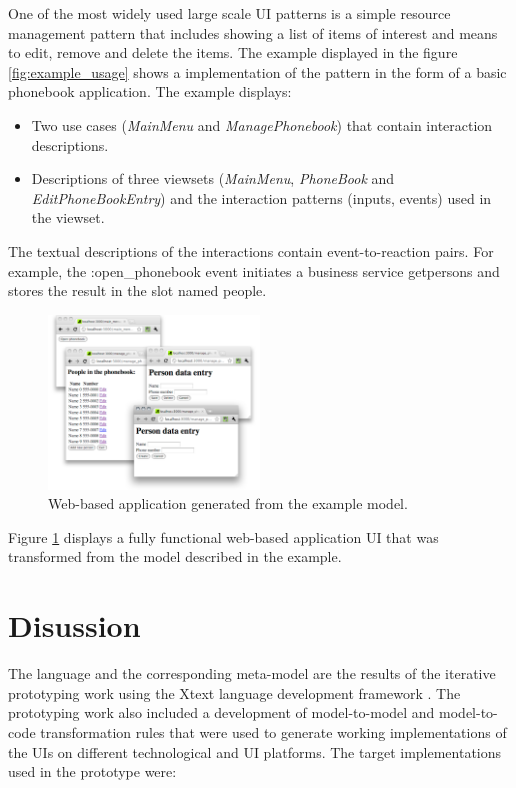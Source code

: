 \documentclass[conference]{IEEEtran}
\begin{document}
One of the most widely used large scale UI patterns is a simple resource
management pattern that includes showing a list of items of interest and means
to edit, remove and delete the items. The example displayed in the figure
\ref{fig:example_usage} shows a implementation of the pattern in the form of a
basic phonebook application. The example displays:

\begin{itemize}
  \item Two use cases (\textit{MainMenu} and \textit{ManagePhonebook}) that
    contain interaction descriptions.
  \item Descriptions of three viewsets (\textit{MainMenu}, \textit{PhoneBook}
    and \textit{EditPhoneBookEntry}) and the interaction patterns (inputs,
    events) used in the viewset.
\end{itemize}

The textual descriptions of the interactions contain event-to-reaction pairs.
For example, the :open\_phonebook event initiates a business service
getpersons and stores the result in the slot named people.

\begin{figure}
  \centering
    \includegraphics[width=0.5\textwidth]{webexample.png}
      \caption{Web-based application generated from the example model.}
      \label{fig:web_based_example}
\end{figure}

Figure \ref{fig:web_based_example} displays a fully functional web-based
application UI that was transformed from the model described in the example.

\section{Disussion}

The language and the corresponding meta-model are the results of the iterative
prototyping work using the Xtext language development framework
\cite{EfftingeVolter06}. The prototyping work also included a development of
model-to-model and model-to-code transformation rules that were used to
generate working implementations of the UIs on different technological and UI
platforms. The target implementations used in the prototype were:
\end{document}
